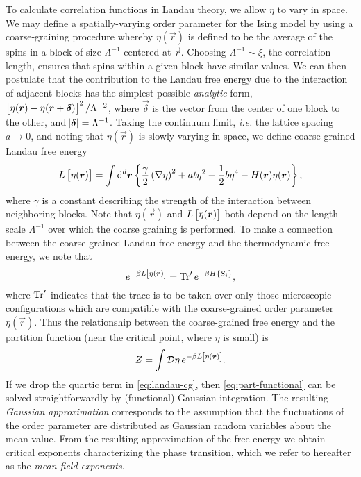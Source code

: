 To calculate correlation functions in Landau theory, we allow $\eta$ to vary in
space. We may define a spatially-varying order parameter for the Ising model by
using a coarse-graining procedure whereby $\eta(\vec{r})$ is defined to be the
average of the spins in a block of size $\Lambda^{-1}$ centered at $\vec{r}$.
Choosing $\Lambda^{-1} \sim \xi$, the correlation length, ensures that spins
within a given block have similar values. We can then postulate that the
contribution to the Landau free energy due to the interaction of adjacent
blocks has the simplest-possible \emph{analytic} form,
$\left[\eta(\bm{r}) - \eta(\bm{r} + \bm{\delta})\right]^2/\Lambda^{-2}$,
where $\vec{\delta}$ is the vector from the center of one block to the other,
and $\abs{\bm{\delta}}=\Lambda^{-1}$. Taking the continuum limit,
\textit{i.e.} the lattice spacing $a \to 0$, and noting that $\eta(\vec{r})$ is
slowly-varying in space, we define coarse-grained Landau free energy
\begin{equation}
  L\sbr{\eta(\vec{r})}
  = \int\dif^d \vec{r}
  \cbr{\frac{\gamma}{2}\del{
      \nabla\eta}^2 + a t \eta^2 + \frac{1}{2} b \eta^4 - H(\vec{r}) \eta(\vec{r})},
  \label{eq:landau-cg}
\end{equation}
where $\gamma$ is a constant describing the strength of the interaction between
neighboring blocks. Note that $\eta(\vec{r})$ and $L\left[\eta(\bm{r})\right]$ both
depend on the length scale $\Lambda^{-1}$ over which the coarse graining is
performed. To make a connection between the coarse-grained Landau free energy
and the thermodynamic free energy, we note that
\begin{equation}
  e^{-\beta L \sbr{\eta(\vec{r})}} = \Tr^{\prime} e^{-\beta H \cbr{S_i}},
\end{equation}
where $\operatorname{Tr}^{\prime}$ indicates that the trace is to be taken over only those
microscopic configurations which are compatible with the coarse-grained order
parameter $\eta(\vec{r})$. Thus the relationship between the coarse-grained
free energy and the partition function (near the critical point, where $\eta$
is small) is
\begin{equation}
  Z = \int\mathcal{D}\eta \, e^{-\beta L \left[\eta(\bm{r})\right]}.
  \label{eq:part-functional}
\end{equation}
If we drop the quartic term in \cref{eq:landau-cg}, then
\cref{eq:part-functional} can be solved straightforwardly by (functional)
Gaussian integration.
The resulting \emph{Gaussian approximation} corresponds to the assumption that
the fluctuations of the order parameter are distributed as Gaussian random
variables about the mean value. From the resulting approximation of the free
energy we obtain critical exponents characterizing the phase transition, which
we refer to hereafter as the \emph{mean-field exponents}.

